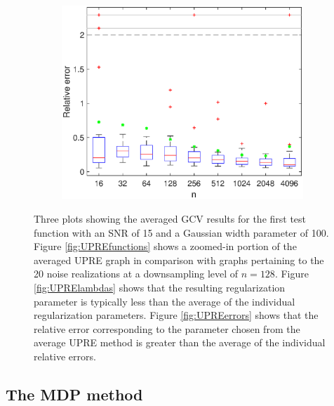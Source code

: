 \documentclass[12pt]{article}
\begin{document}
\begin{figure}
\begin{subfigure}[b]{0.45\textwidth}
        \label{fig:GCVlambdas}
    \end{subfigure}
    \begin{subfigure}[b]{0.45\textwidth}
        \includegraphics[width=\textwidth]{Figures/GCV_ErrPlot1D_F1_S15_W100_R20.eps}
        \caption{}
        \label{fig:GCVerrors}
    \end{subfigure}
    \caption{Three plots showing the averaged GCV results for the first test function with an SNR of 15 and a Gaussian width parameter of 100. Figure \ref{fig:UPREfunctions} shows a zoomed-in portion of the averaged UPRE graph in comparison with graphs pertaining to the 20 noise realizations at a downsampling level of $n = 128$. Figure \ref{fig:UPRElambdas} shows that the resulting regularization parameter is typically less than the average of the individual regularization parameters. Figure \ref{fig:UPREerrors} shows that the relative error corresponding to the parameter chosen from the average UPRE method is greater than the average of the individual relative errors.}
\label{fig:GCVplots}
\end{figure}

\subsection{The MDP method} \label{The MDP method}
\end{document}
